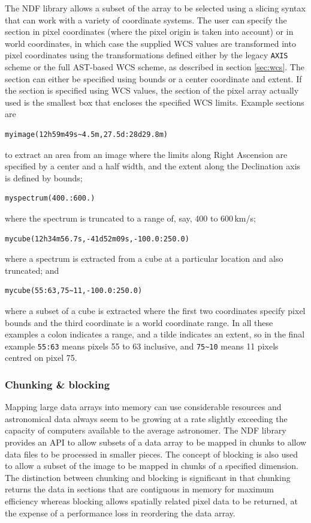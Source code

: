 \documentclass[final,authoryear,5p,times,twocolumn]{elsarticle}
\begin{document}
The NDF library allows a subset of the array to be selected using a
slicing syntax that can work with a variety of coordinate systems. The
user can specify the section in pixel coordinates (where the pixel
origin is taken into account) or in world coordinates, in which case the
supplied WCS values are transformed into pixel coordinates using the
transformations defined either by the legacy \texttt{AXIS} scheme or
the full AST-based WCS scheme, as described in section \ref{sec:wcs}.
The section can either be specified using bounds or a center coordinate
and extent. If the section is specified using WCS values, the section of
the pixel array actually used is the smallest box that encloses the
specified WCS limits. Example sections are
\begin{verbatim}
myimage(12h59m49s~4.5m,27.5d:28d29.8m)
\end{verbatim}
to extract an area from an image where the limits along Right
Ascension are specified by a center  and a half width, and the extent
along the Declination axis is defined by bounds;
\begin{verbatim}
myspectrum(400.:600.)
\end{verbatim}
where the spectrum is truncated to a range of, say, 400 to 600\,km/s;
\begin{verbatim}
mycube(12h34m56.7s,-41d52m09s,-100.0:250.0)
\end{verbatim}
where a spectrum is extracted from a cube at a particular location and
also truncated; and
\begin{verbatim}
mycube(55:63,75~11,-100.0:250.0)
\end{verbatim}
where a subset of a cube is extracted where the first two coordinates
specify pixel bounds and the third coordinate is a world coordinate
range. In all these examples a colon indicates a range, and a tilde
indicates an extent, so in the final example \texttt{55:63} means
pixels 55 to 63 inclusive, and \verb|75~10| means 11 pixels centred
on pixel 75.

\subsubsection{Chunking \& blocking}

Mapping large data arrays into memory can use considerable resources
and astronomical data always seem to be growing at a rate slightly
exceeding the capacity of computers available to the average astronomer. The NDF
library provides an API to allow subsets of a data array to be mapped
in chunks to allow data files to be processed in smaller pieces. The
concept of blocking is also used to allow a subset of the image to be
mapped in chunks of a specified dimension. The distinction between
chunking and blocking is significant in that chunking returns the data
in sections that are contiguous in memory for maximum efficiency
whereas blocking allows spatially related pixel data to be returned, at
the expense of a performance loss in reordering the data array.
\end{document}
